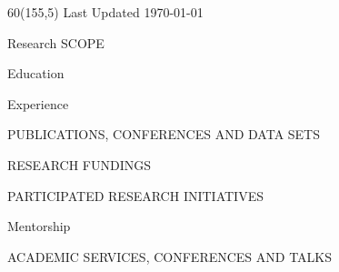 \documentclass{resume} %
\newcommand{\lastupdated}{\begin{textblock}{60}(155,5)
\fontsize{8pt}{10pt}\selectfont 
Last Updated \today
\end{textblock}}
\begin{document}

\lastupdated
\begin{rSection}{Research SCOPE}

\end{rSection}
\begin{rSection}{Education}

\end{rSection}
\begin{rSection}{Experience}

\end{rSection}
\begin{rSection}{PUBLICATIONS, CONFERENCES AND DATA SETS}



\end{rSection}
\begin{rSection}{RESEARCH FUNDINGS}

\end{rSection}
\begin{rSection}{PARTICIPATED RESEARCH INITIATIVES}

\end{rSection}
\begin{rSection}{Mentorship}

\end{rSection}
\begin{rSection}{ACADEMIC SERVICES, CONFERENCES AND TALKS}

\end{rSection}
\end{document}
